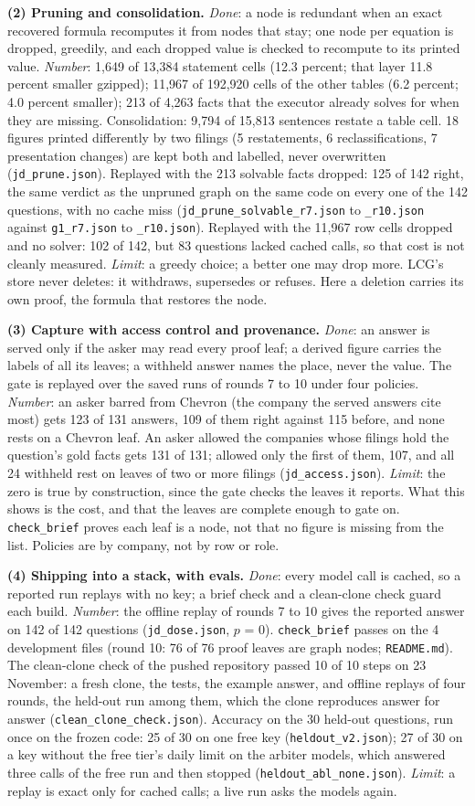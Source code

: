 \documentclass[10pt]{article}
\newcommand{\sub}[1]{\textbf{#1}}
\newcommand{\rf}[1]{{\footnotesize\texttt{#1}}}
\newcommand{\PruneReplay}{Replayed with the 213 solvable facts dropped: 125 of 142 right, the same verdict as the unpruned graph on the same code on every one of the 142 questions, with no cache miss (\rf{jd\_prune\_solvable\_r7.json} to \rf{\_r10.json} against \rf{g1\_r7.json} to \rf{\_r10.json}). Replayed with the 11,967 row cells dropped and no solver: 102 of 142, but 83 questions lacked cached calls, so that cost is not cleanly measured.}
\begin{document}
\sub{(2) Pruning and consolidation.} \emph{Done}: a node is redundant when an exact recovered formula recomputes it from nodes that stay; one node per equation is dropped, greedily, and each dropped value is checked to recompute to its printed value. \emph{Number}: 1,649 of 13,384 statement cells (12.3 percent; that layer 11.8 percent smaller gzipped); 11,967 of 192,920 cells of the other tables (6.2 percent; 4.0 percent smaller); 213 of 4,263 facts that the executor already solves for when they are missing. Consolidation: 9,794 of 15,813 sentences restate a table cell. 18 figures printed differently by two filings (5 restatements, 6 reclassifications, 7 presentation changes) are kept both and labelled, never overwritten (\rf{jd\_prune.json}). \PruneReplay{} \emph{Limit}: a greedy choice; a better one may drop more. LCG's store never deletes: it withdraws, supersedes or refuses. Here a deletion carries its own proof, the formula that restores the node.

\sub{(3) Capture with access control and provenance.} \emph{Done}: an answer is served only if the asker may read every proof leaf; a derived figure carries the labels of all its leaves; a withheld answer names the place, never the value. The gate is replayed over the saved runs of rounds 7 to 10 under four policies. \emph{Number}: an asker barred from Chevron (the company the served answers cite most) gets 123 of 131 answers, 109 of them right against 115 before, and none rests on a Chevron leaf. An asker allowed the companies whose filings hold the question's gold facts gets 131 of 131; allowed only the first of them, 107, and all 24 withheld rest on leaves of two or more filings (\rf{jd\_access.json}). \emph{Limit}: the zero is true by construction, since the gate checks the leaves it reports. What this shows is the cost, and that the leaves are complete enough to gate on. \texttt{check\_brief} proves each leaf is a node, not that no figure is missing from the list. Policies are by company, not by row or role.

\sub{(4) Shipping into a stack, with evals.} \emph{Done}: every model call is cached, so a reported run replays with no key; a brief check and a clean-clone check guard each build. \emph{Number}: the offline replay of rounds 7 to 10 gives the reported answer on 142 of 142 questions (\rf{jd\_dose.json}, $p$ = 0). \texttt{check\_brief} passes on the 4 development files (round 10: 76 of 76 proof leaves are graph nodes; \rf{README.md}). The clean-clone check of the pushed repository passed 10 of 10 steps on 23 November: a fresh clone, the tests, the example answer, and offline replays of four rounds, the held-out run among them, which the clone reproduces answer for answer (\rf{clean\_clone\_check.json}). Accuracy on the 30 held-out questions, run once on the frozen code: 25 of 30 on one free key (\rf{heldout\_v2.json}); 27 of 30 on a key without the free tier's daily limit on the arbiter models, which answered three calls of the free run and then stopped (\rf{heldout\_abl\_none.json}). \emph{Limit}: a replay is exact only for cached calls; a live run asks the models again. 
\end{document}
